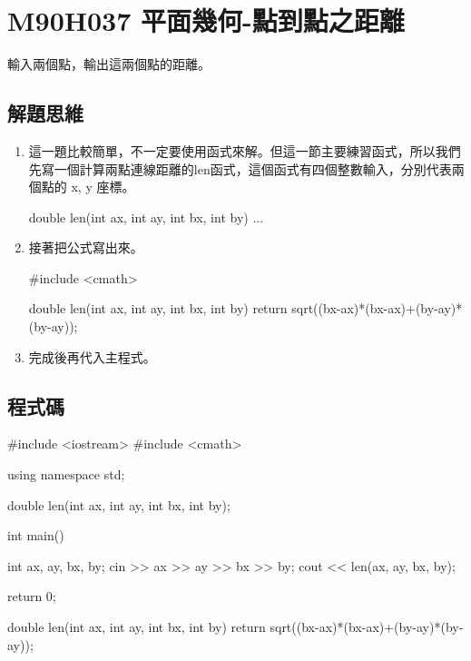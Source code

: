 \section{M90H037 平面幾何-點到點之距離}
輸入兩個點，輸出這兩個點的距離。
\subsection{解題思維}

\begin{enumerate}
	\item 這一題比較簡單，不一定要使用函式來解。但這一節主要練習函式，所以我們先寫一個計算兩點連線距離的len函式，這個函式有四個整數輸入，分別代表兩個點的 x, y 座標。
	\begin{inside}
	double len(int ax, int ay, int bx, int by) {
		...
	}
	\end{inside}
	\item
	接著把公式寫出來。
	\begin{inside}
	#include <cmath>
		
	double len(int ax, int ay, int bx, int by) {
		return sqrt((bx-ax)*(bx-ax)+(by-ay)*(by-ay));
	}			
	\end{inside}
	\item
	完成後再代入主程式。
\end{enumerate} 

\subsection{程式碼}
\begin{cppcode}
	#include <iostream>
	#include <cmath>

	using namespace std;
	
	double len(int ax, int ay, int bx, int by);
	
	int main()
	{
		int ax, ay, bx, by;
		cin >> ax >> ay >> bx >> by;
		cout << len(ax, ay, bx, by);
		
		return 0;
	}
	
	double len(int ax, int ay, int bx, int by) {
		return sqrt((bx-ax)*(bx-ax)+(by-ay)*(by-ay));
	}
\end{cppcode}
